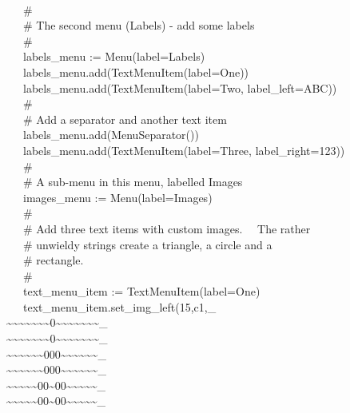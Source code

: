 {\ \\
\>   \ \ \ \# \\
\>   \ \ \ \# The second menu ({\textquotedbl}Labels{\textquotedbl}) -
add some labels \\
\>   \ \ \ \# \\
\>   \ \ \ labels\_menu :=
Menu({\textquotedbl}label=Labels{\textquotedbl}) \\
\>   \ \ \ labels\_menu.add(TextMenuItem({\textquotedbl}label=One{\textquotedbl})) \\
\>   \ \ \ labels\_menu.add(TextMenuItem({\textquotedbl}label=Two{\textquotedbl},
{\textquotedbl}label\_left=ABC{\textquotedbl})) \\
\>   \ \ \ \# \\
\>   \ \ \ \# Add a separator and another text item \\
\>   \ \ \ labels\_menu.add(MenuSeparator()) \\
\>   \ \ \ labels\_menu.add(TextMenuItem({\textquotedbl}label=Three{\textquotedbl},
{\textquotedbl}label\_right=123{\textquotedbl})) \\
\>   \ \ \ \# \\
\>   \ \ \ \# A sub-menu in this menu, labelled
{\textquotedbl}Images{\textquotedbl} \\
\>   \ \ \ images\_menu :=
Menu({\textquotedbl}label=Images{\textquotedbl}) \\
\>   \ \ \ \# \\
\>   \ \ \ \# Add three text items with custom images. \ \ The rather \\
\>   \ \ \ \# unwieldy strings create a triangle, a circle and a \\
\>   \ \ \ \# rectangle. \\
\>   \ \ \ \# \\
\>   \ \ \ text\_menu\_item :=
TextMenuItem({\textquotedbl}label=One{\textquotedbl}) \\
\>   \ \ \ text\_menu\_item.set\_img\_left({\textquotedbl}15,c1,\_ \\
\~{}\~{}\~{}\~{}\~{}\~{}\~{}0\~{}\~{}\~{}\~{}\~{}\~{}\~{}\_ \\
\~{}\~{}\~{}\~{}\~{}\~{}\~{}0\~{}\~{}\~{}\~{}\~{}\~{}\~{}\_ \\
\~{}\~{}\~{}\~{}\~{}\~{}000\~{}\~{}\~{}\~{}\~{}\~{}\_ \\
\~{}\~{}\~{}\~{}\~{}\~{}000\~{}\~{}\~{}\~{}\~{}\~{}\_ \\
\~{}\~{}\~{}\~{}\~{}00\~{}00\~{}\~{}\~{}\~{}\~{}\_ \\
\~{}\~{}\~{}\~{}\~{}00\~{}00\~{}\~{}\~{}\~{}\~{}\_ \\
}
